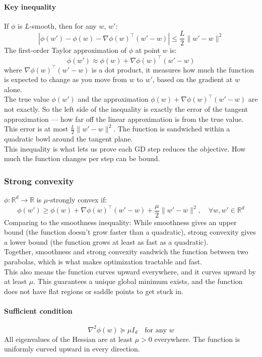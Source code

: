 \documentclass[../Probability.tex]{subfiles}
\begin{document}
\paragraph{Key inequality} If $\phi$ is $L$-smooth, then for any $w$, $w'$:
$$|\phi(w') - \phi(w) - \nabla\phi(w)^\top(w' - w)| \leq \frac{L}{2}\|w' - w\|^2$$
The first-order Taylor approximation of $\phi$ at point $w$ is:
$$\phi(w')\approx \phi(w) + \nabla\phi(w)^\top(w' - w)$$
where $\nabla\phi(w)^\top(w' - w)$ is a dot product, it measures how much the function is expected to change as you move from $w$ to $w'$, based on the gradient at $w$ alone.\\
The true value $\phi(w')$ and the approximation $\phi(w) + \nabla\phi(w)^\top(w' - w)$ are not exactly. So the left side of the inequality is exactly the error of the tangent approximation — how far off the linear approximation is from the true value.\\
This error is at most $\frac{L}{2}\|w' - w\|^2$. The function is sandwiched within a quadratic bowl around the tangent plane.\\
This inequality is what lets us prove each GD step reduces the objective. How much the function changes per step can be bound.

\subsubsection{Strong convexity}
$\phi:\mathbb{R}^d\to\mathbb{R}$ is $\mu$-strongly convex if:
$$\phi(w') \geq \phi(w) + \nabla\phi(w)^\top(w' - w) + \frac{\mu}{2}\|w' - w\|^2, \quad \forall w, w' \in \mathbb{R}^d$$
Comparing to the smoothness inequality: While smoothness gives an upper bound (the function doesn't grow faster than a quadratic), strong convexity gives a lower bound (the function grows at least as fast as a quadratic).\\
Together, smoothness and strong convexity sandwich the function between two parabolas, which is what makes optimization tractable and fast.\\
This also means the function curves upward everywhere, and it curves upward by at least $\mu$. This guarantees a unique global minimum exists, and the function does not have flat regions or saddle points to get stuck in.
\paragraph{Sufficient condition}
$$\nabla^2\phi(w) \succeq \mu I_d \quad \text{for any } w$$
All eigenvalues of the Hessian are at least $\mu > 0$ everywhere. The function is uniformly curved upward in every direction.
\end{document}
